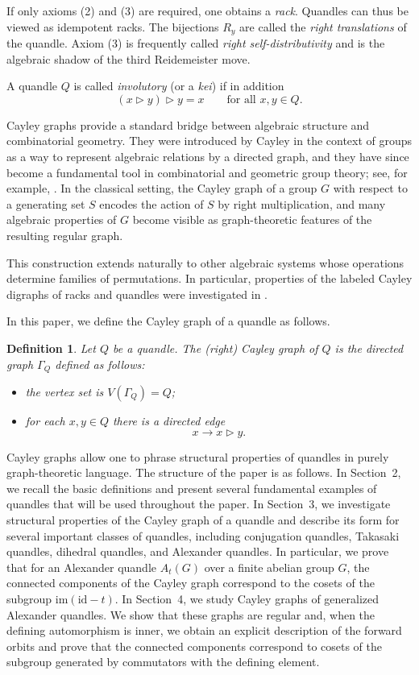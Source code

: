 \documentclass[english,11pt]{amsart}
\newtheorem{Def}[Theorem]{Definition}
\begin{document}
If only axioms (2) and (3) are required, one obtains a \emph{rack}. Quandles can thus be viewed as idempotent racks. The bijections $R_y$ are called the \emph{right translations} of the quandle. Axiom (3) is frequently called \emph{right self-distributivity} and is the algebraic shadow of the third Reidemeister move.

A quandle $Q$ is called \emph{involutory} (or a \emph{kei}) if in addition
\[
(x \rhd y)\rhd y = x \qquad \text{for all } x,y\in Q.
\]

Cayley graphs provide a standard bridge between algebraic structure and combinatorial geometry. 
They were introduced by Cayley in the context of groups as a way to represent algebraic relations by a directed graph, and they have since become a fundamental tool in combinatorial and geometric group theory; see, for example, \cite{Cayley78,deLaHarpe00,GodsilRoyle01}. 
In the classical setting, the Cayley graph of a group $G$ with respect to a generating set $S$ encodes the action of $S$ by right multiplication, and many algebraic properties of $G$ become visible as graph-theoretic features of the resulting regular graph.

This construction extends naturally to other algebraic systems whose operations determine families of permutations. 
In particular, properties of the labeled Cayley digraphs of racks and quandles were investigated in \cite{LucTa}.

In this paper, we define the Cayley graph of a quandle as follows.

\begin{Def}
Let $Q$ be a quandle. The \emph{(right) Cayley graph} of $Q$ is the directed graph $\Gamma_Q$ defined as follows:
\begin{itemize}
  \item the vertex set is $V(\Gamma_Q) = Q$;
  \item for each $x,y \in Q$ there is a directed edge
  \[
  x \rightarrow x \rhd y.
  \]
\end{itemize}
\end{Def}

Cayley graphs allow one to phrase structural properties of quandles in purely graph-theoretic language. 
The structure of the paper is as follows. In Section~2, we recall the basic definitions and present several fundamental examples of quandles that will be used throughout the paper. In Section~3, we investigate structural properties of the Cayley graph of a quandle and describe its form for several important classes of quandles, including conjugation quandles, Takasaki quandles, dihedral quandles, and Alexander quandles. In particular, we prove that for an Alexander quandle $A_t(G)$ over a finite abelian group $G$, the connected components of the Cayley graph correspond to the cosets of the subgroup $\mathrm{im}(\mathrm{id}-t)$. In Section~4, we study Cayley graphs of generalized Alexander quandles. We show that these graphs are regular and, when the defining automorphism is inner, we obtain an explicit description of the forward orbits and prove that the connected components correspond to cosets of the subgroup generated by commutators with the defining element.
\end{document}

